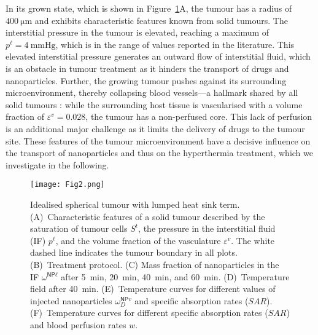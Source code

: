 \documentclass[Times1COL,AMA]{WileyNJDv5} %
\newcommand{\omegaNPl}{\omega^{\textsf{NP}\ell}}
\newcommand{\omegaNPvD}{\omega^{\textsf{NP}v}_D}
\begin{document}
In its grown state, which is shown in Figure~\ref{fig:IdealisedSphericalTumour}A, the tumour has a radius of $\SI{400}{\micro\meter}$ and exhibits characteristic features known from solid tumours.
The interstitial pressure in the tumour is elevated, reaching a maximum of $p^\ell = \SI{4}{\mmHg}$, which is in the range of values reported in the literature. \cite{Boucher1990, Jain2007, Dewhirst2017}
This elevated interstitial pressure generates an outward flow of interstitial fluid, which is an obstacle in tumour treatment as it hinders the transport of drugs and nanoparticles. \cite{Heldin2004}
Further, the growing tumour pushes against its surrounding microenvironment, thereby collapsing blood vessels---a hallmark shared by all solid tumours \cite{Stylianopoulos2012,Provenzano2012,Chauhan2014}:
while the surrounding host tissue is vascularised with a volume fraction of $\varepsilon^v = 0.028$, the tumour has a non-perfused core.
This lack of perfusion is an additional major challenge as it limits the delivery of drugs to the tumour site.
These features of the tumour microenvironment have a decisive influence on the transport of nanoparticles and thus on the hyperthermia treatment, which we investigate in the following.

\begin{figure}[btp]
    \centering
    \texttt{[image: Fig2.png]}
    \caption{Idealised spherical tumour with lumped heat sink term.
        (A)~Characteristic features of a solid tumour described by the saturation of tumour cells $S^t$, the pressure in the interstitial fluid (IF) $p^\ell$, and the volume fraction of the vasculature $\varepsilon^v$.
        The white dashed line indicates the tumour boundary in all plots.
        (B)~Treatment protocol.
        (C) Mass fraction of nanoparticles in the IF $\omegaNPl$ after \SI{5}{\minute}, \SI{20}{\minute}, \SI{40}{\minute}, and \SI{60}{\minute}.
        (D)~Temperature field after \SI{40}{\minute}.
        (E)~Temperature curves for different values of injected nanoparticles $\omegaNPvD$ and specific absorption rates ($SAR$).
        (F)~Temperature curves for different specific absorption rates ($SAR$) and blood perfusion rates $w$.
    }
    \label{fig:IdealisedSphericalTumour}
\end{figure}
\end{document}
